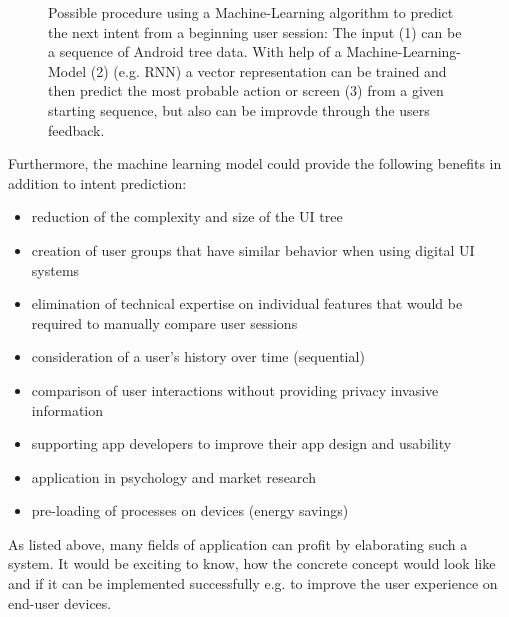 \begin{figure}[htbp!]
  \centering
  
  \caption[Schema of ML-algorithm predicting user intent]{Possible procedure using a Machine-Learning algorithm to predict the next intent from a beginning user session: The input (1) can be a sequence of Android tree data. With help of a Machine-Learning-Model (2) (e.g. RNN) a vector representation can be trained and then predict the most probable action or screen (3) from a given starting sequence, but also can be improvde through the users feedback.}
  \label{fig:encode-decode}
\end{figure}

Furthermore, the machine learning model could provide the following benefits in addition to intent prediction:
\begin{itemize}
  \item reduction of the complexity and size of the UI tree
  \item creation of user groups that have similar behavior when using digital UI systems \cite{jayarajah2015need}
  \item elimination of technical expertise on individual features that would be required to manually compare user sessions \cite{ghods2019activity2vec}
  \item consideration of a user's history over time (sequential)
  \item comparison of user interactions without providing privacy invasive information
  \item supporting app developers to improve their app design and usability
  \item application in psychology and market research
  \item pre-loading of processes on devices (energy savings) \cite{shen2019deepapp}
\end{itemize}

As listed above, many fields of application can profit by elaborating such a system. It would be exciting to know, how the concrete concept would look like and if it can be implemented successfully e.g. to improve the user experience on end-user devices.
